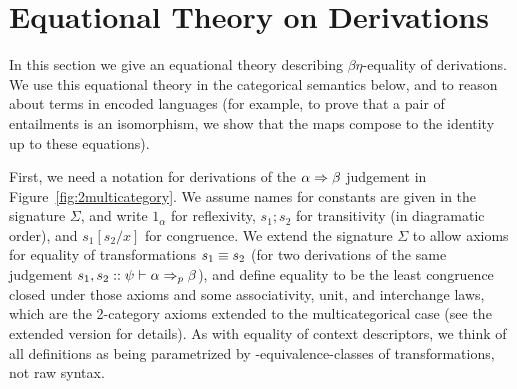 \section{Equational Theory on Derivations}
\label{sec:equational}

In this section we give an equational theory describing $\beta\eta$-equality of
derivations.  We use this equational theory in the categorical semantics
below, and to reason about terms in encoded languages (for example, to
prove that a pair of entailments is an isomorphism, we show that the
maps compose to the identity up to these equations).

First, we need a notation for derivations of the $\alpha \Rightarrow \beta$
judgement in Figure~\ref{fig:2multicategory}.  We assume names for
constants are given in the signature $\Sigma$, and write $1_\alpha$ for
reflexivity, $s_1;s_2$ for transitivity (in diagramatic order), and
$s_1[s_2/x]$ for congruence.  We extend the signature $\Sigma$ to allow
axioms for equality of transformations $s_1 \equiv s_2$ (for two
derivations of the same judgement $s_1,s_2 ::
\psi \vdash \alpha \Rightarrow_{p} \beta$), and define equality to be the least
congruence closed under those axioms and some associativity, unit, and
interchange laws, which are the 2-category axioms extended to the
multicategorical case (see the extended version for details).  As with
equality of context descriptors, we think of all definitions as being
parametrized by \deq-equivalence-classes of transformations, not raw
syntax.

